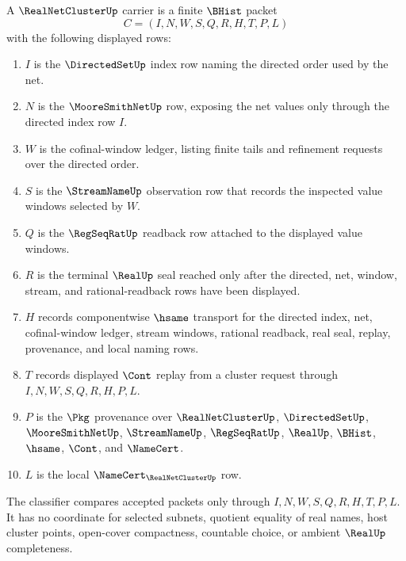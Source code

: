 \begin{definition}
\label{def:real-net-cluster-carrier}
A $\RealNetClusterUp$ carrier is a finite $\BHist$ packet
$$
C=(I,N,W,S,Q,R,H,T,P,L)
$$
with the following displayed rows:
\begin{enumerate}
\item $I$ is the $\DirectedSetUp$ index row naming the directed order used by the net.
\item $N$ is the $\MooreSmithNetUp$ row, exposing the net values only through the directed index row $I$.
\item $W$ is the cofinal-window ledger, listing finite tails and refinement requests over the directed order.
\item $S$ is the $\StreamNameUp$ observation row that records the inspected value windows selected by $W$.
\item $Q$ is the $\RegSeqRatUp$ readback row attached to the displayed value windows.
\item $R$ is the terminal $\RealUp$ seal reached only after the directed, net, window, stream, and rational-readback rows have been displayed.
\item $H$ records componentwise $\hsame$ transport for the directed index, net, cofinal-window ledger, stream windows, rational readback, real seal, replay, provenance, and local naming rows.
\item $T$ records displayed $\Cont$ replay from a cluster request through $I,N,W,S,Q,R,H,P,L$.
\item $P$ is the $\Pkg$ provenance over $\RealNetClusterUp$, $\DirectedSetUp$, $\MooreSmithNetUp$, $\StreamNameUp$, $\RegSeqRatUp$, $\RealUp$, $\BHist$, $\hsame$, $\Cont$, and $\NameCert$.
\item $L$ is the local $\NameCert_{\RealNetClusterUp}$ row.
\end{enumerate}
The classifier compares accepted packets only through $I,N,W,S,Q,R,H,T,P,L$. It has no coordinate for selected subnets, quotient equality of real names, host cluster points, open-cover compactness, countable choice, or ambient $\RealUp$ completeness.
\end{definition}

